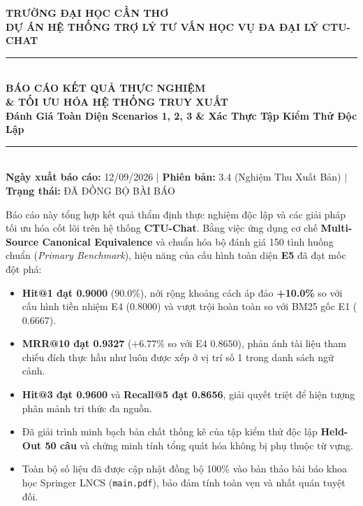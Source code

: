 \documentclass[a4paper,10pt]{article}
\begin{document}
\begin{center}
    {\Large\bfseries\color{primary} TRƯỜNG ĐẠI HỌC CẦN THƠ}\\[0.2em]
    {\normalsize\bfseries\color{secondary} DỰ ÁN HỆ THỐNG TRỢ LÝ TƯ VẤN HỌC VỤ ĐA ĐẠI LÝ CTU-CHAT}\\[1.2em]
    \rule{\textwidth}{1.2pt}\\[0.6em]
    {\LARGE\bfseries\color{primary} BÁO CÁO KẾT QUẢ THỰC NGHIỆM\\\& TỐI ƯU HÓA HỆ THỐNG TRUY XUẤT}\\[0.4em]
    {\normalsize\bfseries\color{darkgray} Đánh Giá Toàn Diện Scenarios 1, 2, 3 \& Xác Thực Tập Kiểm Thử Độc Lập}\\[0.5em]
    \rule{\textwidth}{0.6pt}\\[0.6em]
    {\footnotesize\color{darkgray} \textbf{Ngày xuất báo cáo:} 12/09/2026 \quad $\vert$ \quad \textbf{Phiên bản:} 3.4 (Nghiệm Thu Xuất Bản) \quad $\vert$ \quad \textbf{Trạng thái:} ĐÃ ĐỒNG BỘ BÀI BÁO}
\end{center}

\vspace{0.5em}

\begin{infobox}
Báo cáo này tổng hợp kết quả thẩm định thực nghiệm độc lập và các giải pháp tối ưu hóa cốt lõi trên hệ thống \textbf{CTU-Chat}. Bằng việc ứng dụng cơ chế \textbf{Multi-Source Canonical Equivalence} và chuẩn hóa bộ đánh giá 150 tình huống chuẩn (\textit{Primary Benchmark}), hiệu năng của cấu hình toàn diện \textbf{E5} đã đạt mốc đột phá:
\begin{itemize}[itemsep=1.5pt,topsep=2pt]
    \item \textbf{Hit@1 đạt 0.9000} ($90.0\%$), nới rộng khoảng cách áp đảo \textbf{+10.0\%} so với cấu hình tiền nhiệm E4 ($0.8000$) và vượt trội hoàn toàn so với BM25 gốc E1 ($0.6667$).
    \item \textbf{MRR@10 đạt 0.9327} ($+6.77\%$ so với E4 $0.8650$), phản ánh tài liệu tham chiếu đích thực hầu như luôn được xếp ở vị trí số 1 trong danh sách ngữ cảnh.
    \item \textbf{Hit@3 đạt 0.9600} và \textbf{Recall@5 đạt 0.8656}, giải quyết triệt để hiện tượng phân mảnh tri thức đa nguồn.
    \item Đã giải trình minh bạch bản chất thống kê của tập kiểm thử độc lập \textbf{Held-Out 50 câu} và chứng minh tính tổng quát hóa không bị phụ thuộc từ vựng.
    \item Toàn bộ số liệu đã được cập nhật đồng bộ 100\% vào bản thảo bài báo khoa học Springer LNCS (\texttt{main.pdf}), bảo đảm tính toàn vẹn và nhất quán tuyệt đối.
\end{itemize}
\end{infobox}
\end{document}
